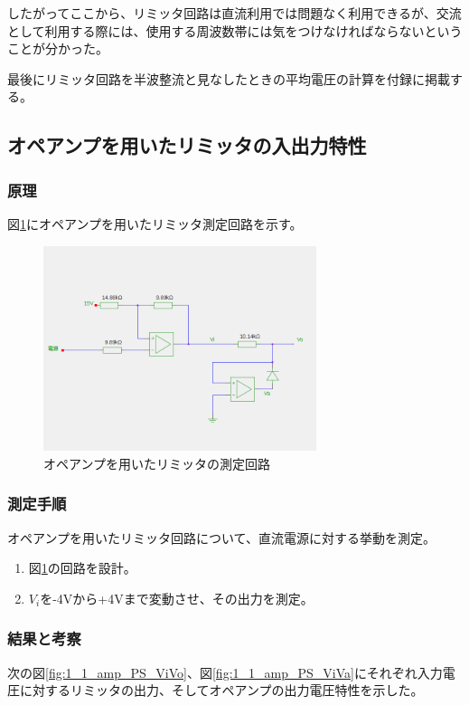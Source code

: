 \documentclass[11pt,a4j]{jsarticle}
\begin{document}
    したがってここから、リミッタ回路は直流利用では問題なく利用できるが、交流として利用する際には、使用する周波数帯には気をつけなければならないということが分かった。
    
    最後にリミッタ回路を半波整流と見なしたときの平均電圧の計算を付録に掲載する。
    
    
  \subsection{オペアンプを用いたリミッタの入出力特性}
   \subsubsection{原理}
    
    図\ref{fig:amp_tokusei}にオペアンプを用いたリミッタ測定回路を示す。
    
    \begin{figure}[htbp]
  \centering
  \includegraphics[width=8cm,clip]{amp_tokusei.png}
  \caption{オペアンプを用いたリミッタの測定回路}
  \label{fig:amp_tokusei}
 \end{figure}%
    
   \subsubsection{測定手順}
    オペアンプを用いたリミッタ回路について、直流電源に対する挙動を測定。
    \begin{enumerate}
    \item 図\ref{fig:amp_tokusei}の回路を設計。
    \item $V_i$を-4Vから+4Vまで変動させ、その出力を測定。
    \end{enumerate}
    
   \subsubsection{結果と考察} \label{sec:amp_tokusei}
    次の図\ref{fig:1_1_amp_PS_ViVo}、図\ref{fig:1_1_amp_PS_ViVa}にそれぞれ入力電圧に対するリミッタの出力、そしてオペアンプの出力電圧特性を示した。
    
\end{document}
